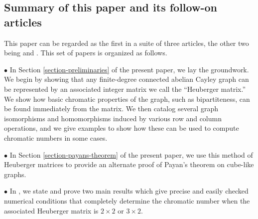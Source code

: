 \documentclass{article}
\theoremstyle{definition}
\theoremstyle{remark}
\begin{document}
\subsection{Summary of this paper and its follow-on articles}

This paper can be regarded as the first in a suite of three articles, the other two being \cite{Cervantes-Krebs-small-cases} and \cite{Cervantes-Krebs-Zhu}.  This set of papers is organized as follows.

$\bullet$ In Section \ref{section-preliminaries} of the present paper, we lay the groundwork.  We begin by showing that any finite-degree connected abelian Cayley graph can be represented by an associated integer matrix we call the ``Heuberger matrix.''  We show how basic chromatic properties of the graph, such as bipartiteness, can be found immediately from the matrix.  We then catalog several graph isomorphisms and homomorphisms induced by various row and column operations, and we give examples to show how these can be used to compute chromatic numbers in some cases.

$\bullet$ In Section \ref{section-payans-theorem} of the present paper, we use this method of Heuberger matrices to provide an alternate proof of Payan's theorem on cube-like graphs.

$\bullet$ In \cite{Cervantes-Krebs-small-cases}, we state and prove two main results which give precise and easily checked numerical conditions that completely determine the chromatic number when the associated Heuberger matrix is $2\times 2$ or $3\times 2$.

\end{document}
